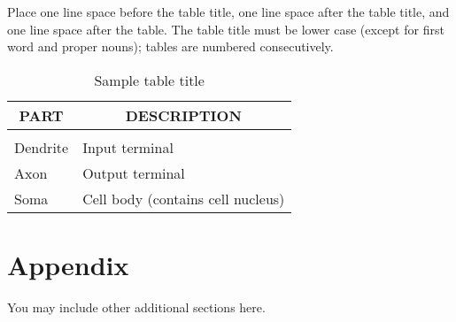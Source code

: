 \documentclass{article} %
\begin{document}
Place one line space before the table title, one line space after the table
title, and one line space after the table. The table title must be lower case
(except for first word and proper nouns); tables are numbered consecutively.

\begin{table}[t]
\caption{Sample table title}
\label{sample-table}
\begin{center}
\begin{tabular}{ll}
\multicolumn{1}{c}{\bf PART}  &\multicolumn{1}{c}{\bf DESCRIPTION}
\\ \hline \\
Dendrite         &Input terminal \\
Axon             &Output terminal \\
Soma             &Cell body (contains cell nucleus) \\
\end{tabular}
\end{center}
\end{table}

\section{Appendix}
You may include other additional sections here.
\end{document}
